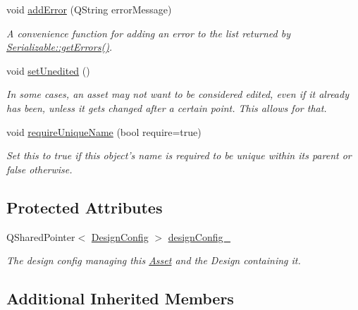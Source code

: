 \begin{DoxyCompactItemize}
void \hyperlink{class_picto_1_1_asset_ab39eeff6773463836ac5f0397f4374f7}{add\-Error} (Q\-String error\-Message)
\begin{DoxyCompactList}\small\item\em A convenience function for adding an error to the list returned by \hyperlink{class_picto_1_1_serializable_a9b14c771646820d10e082d351cd4cf50}{Serializable\-::get\-Errors()}. \end{DoxyCompactList}\item 
void \hyperlink{class_picto_1_1_asset_a7419ed75ae864febd703b9ebd9346d16}{set\-Unedited} ()
\begin{DoxyCompactList}\small\item\em In some cases, an asset may not want to be considered edited, even if it already has been, unless it gets changed after a certain point. This allows for that. \end{DoxyCompactList}\item 
void \hyperlink{class_picto_1_1_asset_ac36a8ea172fc566e31a4c2946f78eb59}{require\-Unique\-Name} (bool require=true)
\begin{DoxyCompactList}\small\item\em Set this to true if this object's name is required to be unique within its parent or false otherwise. \end{DoxyCompactList}\end{DoxyCompactItemize}
\subsection*{Protected Attributes}
\begin{DoxyCompactItemize}
\item 
\hypertarget{class_picto_1_1_asset_a70fb85473984a1c8dc2f9a9079364f73}{Q\-Shared\-Pointer$<$ \hyperlink{class_picto_1_1_design_config}{Design\-Config} $>$ \hyperlink{class_picto_1_1_asset_a70fb85473984a1c8dc2f9a9079364f73}{design\-Config\-\_\-}}\label{class_picto_1_1_asset_a70fb85473984a1c8dc2f9a9079364f73}

\begin{DoxyCompactList}\small\item\em The design config managing this \hyperlink{class_picto_1_1_asset}{Asset} and the Design containing it. \end{DoxyCompactList}\end{DoxyCompactItemize}
\subsection*{Additional Inherited Members}


